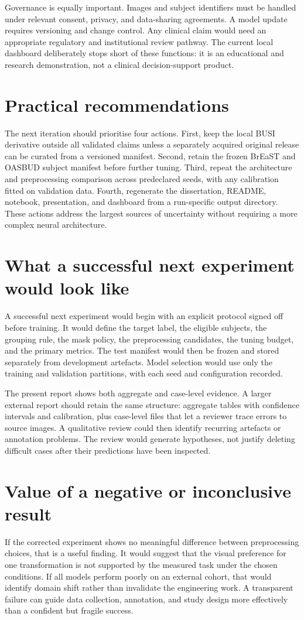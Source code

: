 Governance is equally important. Images and subject identifiers must be handled under relevant consent, privacy, and data-sharing agreements. A model update requires versioning and change control. Any clinical claim would need an appropriate regulatory and institutional review pathway. The current local dashboard deliberately stops short of these functions: it is an educational and research demonstration, not a clinical decision-support product.

\section{Practical recommendations}
The next iteration should prioritise four actions. First, keep the local BUSI derivative outside all validated claims unless a separately acquired original release can be curated from a versioned manifest. Second, retain the frozen BrEaST and OASBUD subject manifest before further tuning. Third, repeat the architecture and preprocessing comparison across predeclared seeds, with any calibration fitted on validation data. Fourth, regenerate the dissertation, README, notebook, presentation, and dashboard from a run-specific output directory. These actions address the largest sources of uncertainty without requiring a more complex neural architecture.

\section{What a successful next experiment would look like}
A successful next experiment would begin with an explicit protocol signed off before training. It would define the target label, the eligible subjects, the grouping rule, the mask policy, the preprocessing candidates, the tuning budget, and the primary metrics. The test manifest would then be frozen and stored separately from development artefacts. Model selection would use only the training and validation partitions, with each seed and configuration recorded.

The present report shows both aggregate and case-level evidence. A larger external report should retain the same structure: aggregate tables with confidence intervals and calibration, plus case-level files that let a reviewer trace errors to source images. A qualitative review could then identify recurring artefacts or annotation problems. The review would generate hypotheses, not justify deleting difficult cases after their predictions have been inspected.

\section{Value of a negative or inconclusive result}
If the corrected experiment shows no meaningful difference between preprocessing choices, that is a useful finding. It would suggest that the visual preference for one transformation is not supported by the measured task under the chosen conditions. If all models perform poorly on an external cohort, that would identify domain shift rather than invalidate the engineering work. A transparent failure can guide data collection, annotation, and study design more effectively than a confident but fragile success.

